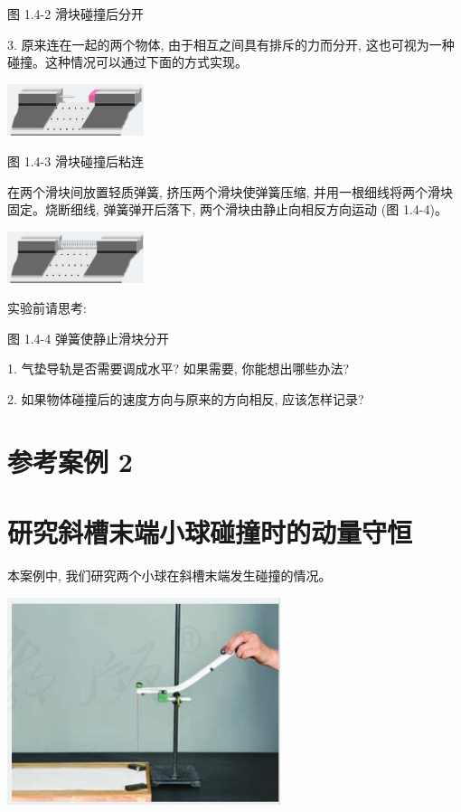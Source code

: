 \documentclass[10pt]{article}
\begin{document}
图 1.4-2 滑块碰撞后分开

3. 原来连在一起的两个物体, 由于相互之间具有排斥的力而分开, 这也可视为一种碰撞。这种情况可以通过下面的方式实现。

\begin{center}
\includegraphics[max width=0.3\textwidth]{images/01910e4c-ebb8-7d2c-8f2f-2375bc1d2d12_24_781474.jpg}
\end{center}

图 1.4-3 滑块碰撞后粘连

在两个滑块间放置轻质弹簧, 挤压两个滑块使弹簧压缩, 并用一根细线将两个滑块固定。烧断细线, 弹簧弹开后落下, 两个滑块由静止向相反方向运动 (图 1.4-4)。

\begin{center}
\includegraphics[max width=0.3\textwidth]{images/01910e4c-ebb8-7d2c-8f2f-2375bc1d2d12_24_959670.jpg}
\end{center}

实验前请思考:

图 1.4-4 弹簧使静止滑块分开

1. 气垫导轨是否需要调成水平? 如果需要, 你能想出哪些办法?

2. 如果物体碰撞后的速度方向与原来的方向相反, 应该怎样记录?

\section*{参考案例 2}

\section*{研究斜槽末端小球碰撞时的动量守恒}

本案例中, 我们研究两个小球在斜槽末端发生碰撞的情况。

\begin{center}
\includegraphics[max width=0.6\textwidth]{images/01910e4c-ebb8-7d2c-8f2f-2375bc1d2d12_24_559716.jpg}
\end{center}
\end{document}
